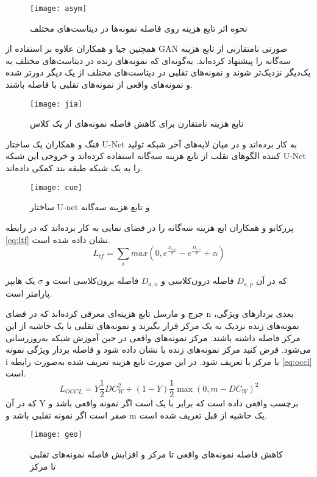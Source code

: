 \begin{figure}[h]
	\centerline{\texttt{[image: asym]}}
	\caption{نحوه اثر تابع هزینه روی فاصله نمونه‌ها در دیتاست‌های مختلف \cite{shao2019multi} }
	\label{fig:asym}
\end{figure}

همچنین جیا و همکاران
\cite{jia2020single}
 علاوه بر استفاده از GAN صورتی نامتقارنی از تابع هزینه سه‌گانه را پیشنهاد کرده‌اند. به‌گونه‌ای که نمونه‌های زنده در دیتاست‌های مختلف به یک‌دیگر نزدیک‌تر شوند و نمونه‌های تقلبی در دیتاست‌های مختلف از یک دیگر دورتر شده و نمونه‌های واقعی از نمونه‌های تقلبی با فاصله باشند. 
 
 \begin{figure}[h]
 	\centerline{\texttt{[image: jia]}}
 	\caption{تابع هزینه نامتقارن برای کاهش فاصله نمونه‌های از یک کلاس \cite{jia2020single} }
 	\label{fig:jia}
 \end{figure}

فنگ و همکاران
\cite{feng2020learning}
یک ساختار U-Net
\cite{ronneberger2015u}
به کار برده‌اند و در میان لایه‌های آخر شبکه تولید کننده الگوهای تقلب از تابع هزینه سه‌گانه استفاده کرده‌اند و خروجی این شبکه U-Net را به یک شبکه طبقه بند کمکی داده‌اند.

 \begin{figure}[h]
	\centerline{\texttt{[image: cue]}}
	\caption{ساختار U-net و تابع هزینه سه‌گانه \cite{feng2020learning} }
	\label{fig:cue}
\end{figure}

پرزکابو و همکاران
\cite{perez2019deep}
ابع هزینه سه‌گانه را در فضای نمایی به کار برده‌اند که در رابطه
\ref{eq:ltf}
نشان داده شده است.
 \begin{equation}\label{eq:ltf}
	L_{tf} = \sum_{i}{max(0,e^{\frac{D_{a,p}}{\sigma}}-e^{\frac{D_{a,n}}{\sigma}}+\alpha)}
\end{equation}

که در آن
$D_{a,p}$
فاصله درون‌کلاسی و
$D_{a,n}$
فاصله برون‌کلاسی است و
$\sigma$
یک هایپر پارامتر است.

جرج و مارسل
\cite{george2020learning} 
 تابع هزینه‌ای معرفی کرده‌اند که در فضای n بعدی بردارهای ویژگی، نمونه‌های زنده نزدیک به یک مرکز قرار بگیرند و نمونه‌های تقلبی با یک حاشیه از این مرکز فاصله داشته باشند. مرکز نمونه‌های واقعی در حین آموزش شبکه به‌روزرسانی می‌شود.
فرض کنید مرکز نمونه‌های زنده با  نشان داده شود و فاصله بردار ویژگی نمونه i با مرکز با  تعریف شود. در این صورت تابع هزینه تعریف شده به‌صورت رابطه
\ref{eq:occl}
است.
 \begin{equation}\label{eq:occl}
L_{OCCL}=Y\frac{1}{2}DC^2_W+(1-Y)\frac{1}{2}\max(0,m-DC_W)^2
\end{equation}
که در آن Y برچسب واقعی داده است که برابر با یک است اگر نمونه واقعی باشد و صفر است اگر نمونه تقلبی باشد و m یک حاشیه از قبل تعریف شده است.
 \begin{figure}[h]
	\centerline{\texttt{[image: geo]}}
	\caption{کاهش فاصله نمونه‌های واقعی تا مرکز و افزایش فاصله نمونه‌های تقلبی تا مرکز \cite{george2020learning} }
	\label{fig:geo}
\end{figure}


